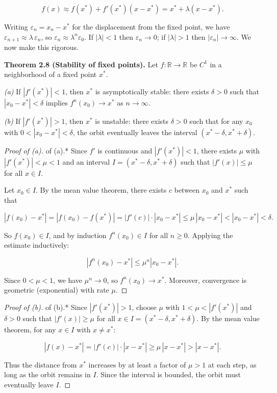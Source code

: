 \[
f(x) \approx f(x^*) + f'(x^*)(x - x^*) = x^* + \lambda(x - x^*).
\]

Writing $\varepsilon_n = x_n - x^*$ for the displacement from the fixed point, we have $\varepsilon_{n+1} \approx \lambda \, \varepsilon_n$, so $\varepsilon_n \approx \lambda^n \varepsilon_0$. If $|\lambda| < 1$ then $\varepsilon_n \to 0$; if $|\lambda| > 1$ then $|\varepsilon_n| \to \infty$. We now make this rigorous.

\textbf{Theorem 2.8 (Stability of fixed points).} Let $f: \mathbb{R} \to \mathbb{R}$ be $C^1$ in a neighborhood of a fixed point $x^*$.

\textit{(a)} If $|f'(x^*)| < 1$, then $x^*$ is asymptotically stable: there exists $\delta > 0$ such that $|x_0 - x^*| < \delta$ implies $f^n(x_0) \to x^*$ as $n \to \infty$.

\textit{(b)} If $|f'(x^*)| > 1$, then $x^*$ is unstable: there exists $\delta > 0$ such that for any $x_0$ with $0 < |x_0 - x^*| < \delta$, the orbit eventually leaves the interval $(x^* - \delta, x^* + \delta)$.

\begin{proof}[Proof of (a)]
of (a).* Since $f'$ is continuous and $|f'(x^*)| < 1$, there exists $\mu$ with $|f'(x^*)| < \mu < 1$ and an interval $I = (x^* - \delta, x^* + \delta)$ such that $|f'(x)| \leq \mu$ for all $x \in I$.

Let $x_0 \in I$. By the mean value theorem, there exists $c$ between $x_0$ and $x^*$ such that

\[
|f(x_0) - x^*| = |f(x_0) - f(x^*)| = |f'(c)| \cdot |x_0 - x^*| \leq \mu \, |x_0 - x^*| < |x_0 - x^*| < \delta.
\]

So $f(x_0) \in I$, and by induction $f^n(x_0) \in I$ for all $n \geq 0$. Applying the estimate inductively:

\[
|f^n(x_0) - x^*| \leq \mu^n |x_0 - x^*|.
\]

Since $0 < \mu < 1$, we have $\mu^n \to 0$, so $f^n(x_0) \to x^*$. Moreover, convergence is geometric (exponential) with rate $\mu$.
\end{proof}


\begin{proof}[Proof of (b)]
of (b).* Since $|f'(x^*)| > 1$, choose $\mu$ with $1 < \mu < |f'(x^*)|$ and $\delta > 0$ such that $|f'(x)| \geq \mu$ for all $x \in I = (x^* - \delta, x^* + \delta)$. By the mean value theorem, for any $x \in I$ with $x \neq x^*$:

\[
|f(x) - x^*| = |f'(c)| \cdot |x - x^*| \geq \mu \, |x - x^*| > |x - x^*|.
\]

Thus the distance from $x^*$ increases by at least a factor of $\mu > 1$ at each step, as long as the orbit remains in $I$. Since the interval is bounded, the orbit must eventually leave $I$.
\end{proof}


